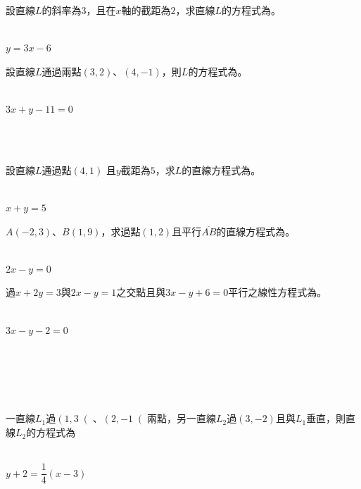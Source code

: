\documentclass
[answers]
{exam}
\newcommand\ul[1]{\uline{\hspace*{#1}}}
\theoremstyle{definition}
\begin{document}
\begin{questions}
\question

設直線$L$的斜率為$3$，且在$x$軸的截距為$2$，求直線$L$的方程式為\ul{50pt}。
\\ 
\begin{solution}~\\
	$y = 3x - 6$
\end{solution}

\question

設直線$L$通過兩點$\left( 3,2\right)$、$\left( 4,-1\right)$，則$L$的方程式為\ul{50pt}。
\\ 
\begin{solution}~\\
	$3x + y - 11 = 0$
\end{solution}

$ $\\$ $\\
\question

設直線$L$通過點$\left( 4,1\right)$ 且$y$截距為$5$，求$L$的直線方程式為\ul{50pt}。
\\ 
\begin{solution}~\\
	$x + y = 5$
\end{solution}

\question

$A\left( -2,3\right)$、$B\left( 1,9\right)$，求過點$\left( 1,2\right)$且平行$\overline{AB}$的直線方程式為\ul{50pt}。
\\ 
\begin{solution}~\\
	$2x - y = 0$
\end{solution}

\question

過$x+2y=3$與$2x-y=1$之交點且與$3x-y+6=0$平行之線性方程式為\ul{50pt}。
\\ 
\begin{solution}~\\
	$3x - y - 2 = 0$
\end{solution}

$ $\\$ $\\$ $\\$ $\\
\question

一直線$L_1$過$\left( 1,3\right($、$\left( 2,-1\right($兩點，另一直線$L_2$過$\left( 3,-2  \right)$且與$L_1$垂直，則直線$L_2$的方程式為\ul{50pt}
\\ 
\begin{solution}~\\
	$y + 2 = \dfrac{1}{4} \left( x-3 \right)$
\end{solution}


\end{questions}
\end{document}
